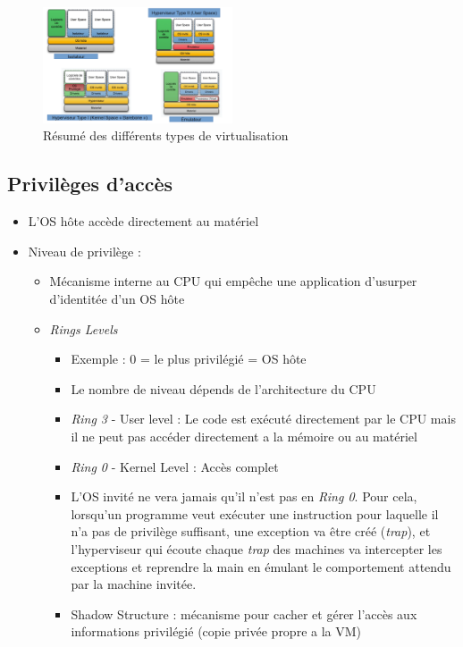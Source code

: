 \documentclass[a4paper]{article}
\begin{document}
      \begin{figure}[H]
        \centering
        \includegraphics[width = 0.5\textwidth]{images/1.PNG}
        \caption{Résumé des différents types de virtualisation}
      \end{figure}

    \subsection{Privilèges d'accès}
    
    \begin{itemize}
      \item L'OS hôte accède directement au matériel
      \item Niveau de privilège :
      \begin{itemize}
        \item Mécanisme interne au CPU qui empêche une application d'usurper d'identitée d'un OS hôte
        \item \emph{Rings Levels}
        \begin{itemize}
          \item Exemple : 0 = le plus privilégié = OS hôte
          \item Le nombre de niveau dépends de l'architecture du CPU
          \item \emph{Ring 3} - User level : Le code est exécuté directement par le CPU mais il ne peut pas accéder directement a la mémoire ou au matériel
          \item \emph{Ring 0} - Kernel Level : Accès complet
          \item L'OS invité ne vera jamais qu'il n'est pas en \emph{Ring 0}. Pour cela, lorsqu'un programme veut exécuter une instruction pour laquelle il n'a pas de privilège
          suffisant, une exception va être créé (\emph{trap}), et l'hyperviseur qui écoute chaque \emph{trap} des machines va intercepter les exceptions et reprendre la main 
          en émulant le comportement attendu par la machine invitée.
          \item Shadow Structure : mécanisme pour cacher et gérer l'accès aux informations privilégié (copie privée propre a la VM)
        \end{itemize}
        
      \end{itemize}
    \end{itemize}
    
\end{document}
